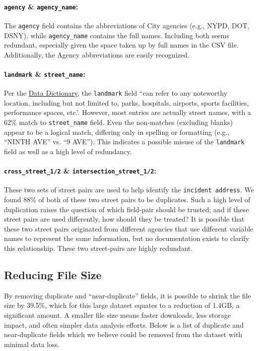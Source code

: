 \documentclass[linenumber]{jdsart}
\begin{document}
\paragraph{\texttt{agency} \& \texttt{agency\_name}:} The \texttt{agency} 
field contains the abbreviations of City agencies (e.g., NYPD, DOT, DSNY), 
while \texttt{agency\_name} contains the full names. Including both seems 
redundant, especially given the space taken up by full names in the 
CSV file. Additionally, the Agency abbreviations are easily recognized.

\paragraph{\texttt{landmark} \& \texttt{street\_name}:} Per the \href{https://data.cityofnewyork.us/api/views/erm2-nwe9/files/b372b884-f86a-453b-ba16-1fe06ce9d212?download=true&filename=311_ServiceRequest_2010-Present_DataDictionary_Updated_2023.xlsx}{Data Dictionary}, 
the \texttt{landmark} field ``can refer to any noteworthy location, 
including but not limited to, parks, hospitals, airports, sports facilities, 
performance spaces, etc.'. However, most entries are actually 
street names, with a 62\% match to \texttt{street\_name} field. 
Even the non\mbox{-}matches (excluding blanks) appear to be 
a logical match, differing only in spelling or formatting 
(e.g., ``NINTH AVE'' vs. ``9 AVE''). This indicates a possible 
misuse of the \texttt{landmark} field as well as a high level of redundancy.

\paragraph{\texttt{cross\_street\_1/2} \& \texttt{intersection\_street\_1/2}:} These 
two sets of street pairs are used to help identify the 
\texttt{incident address}. We found 88\% of both of these two 
street pairs to be duplicates. Such a high level of duplication 
raises the question of which field\mbox{-}pair should be trusted; 
and if these street pairs are used differently, how should they be treated?
It is possible that these two street pairs originated from different 
agencies that use different variable names to represent the same 
information, but no documentation exists to clarify this 
relationship. These two street\mbox{-}pairs are highly redundant.


\subsection{Reducing File Size}
\label{sec:filesize}
By removing duplicate and ``near\mbox{-}duplicate'' fields, it is possible to 
shrink the file size by 39.5\%, which for this large dataset equates to 
a reduction of 1.4GB, a significant amount. A smaller file size 
means faster downloads, less storage impact, and often 
simpler data analysis efforts. Below is a list of duplicate 
and near\mbox{-}duplicate fields which we believe could be
removed from the dataset with minimal data loss. 
\end{document}
